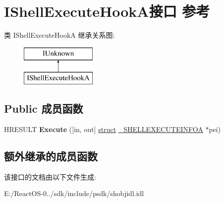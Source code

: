\hypertarget{interface_i_shell_execute_hook_a}{}\section{I\+Shell\+Execute\+Hook\+A接口 参考}
\label{interface_i_shell_execute_hook_a}
类 I\+Shell\+Execute\+HookA 继承关系图\+:\begin{figure}[H]
\begin{center}
\leavevmode
\includegraphics[height=2.000000cm]{interface_i_shell_execute_hook_a}
\end{center}
\end{figure}
\subsection*{Public 成员函数}
\begin{DoxyCompactItemize}
\item 
\mbox{\label{interface_i_shell_execute_hook_a_a3d20dbb18d0758675331d6b8bfb084fb}} 
H\+R\+E\+S\+U\+LT {\bfseries Execute} (\mbox{[}in, out\mbox{]} \hyperlink{interfacestruct}{struct} \hyperlink{struct___s_h_e_l_l_e_x_e_c_u_t_e_i_n_f_o_a}{\+\_\+\+S\+H\+E\+L\+L\+E\+X\+E\+C\+U\+T\+E\+I\+N\+F\+OA} $\ast$pei)
\end{DoxyCompactItemize}
\subsection*{额外继承的成员函数}


该接口的文档由以下文件生成\+:\begin{DoxyCompactItemize}
\item 
E\+:/\+React\+O\+S-\/0../sdk/include/psdk/shobjidl.\+idl\end{DoxyCompactItemize}
